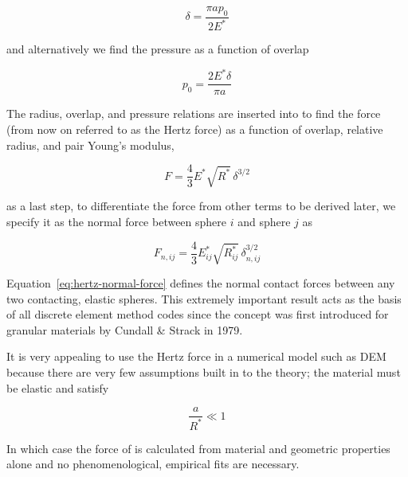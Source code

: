 \begin{equation}
	\delta = \frac{\pi a p_0}{2E^*}
\end{equation}

and alternatively we find the pressure as a function of overlap

\begin{equation}\label{eq:hertzian-pressure}
	p_0 = \frac{2E^*\delta}{\pi a}
\end{equation}

The radius, overlap, and pressure relations are inserted into  to find the force (from now on referred to as the Hertz force) as a function of overlap, relative radius, and pair Young's modulus,

\begin{equation}\label{eq:hertz-force}
	F = \frac{4}{3}E^* \sqrt{R^*} \, \delta^{3/2}
\end{equation}

as a last step, to differentiate the force from other terms to be derived later, we specify it as the normal force between sphere $i$ and sphere $j$ as

\begin{equation}\label{eq:hertz-normal-force}
	F_{n,ij} = \frac{4}{3}E_{ij}^* \sqrt{R_{ij}^*} \, \delta_{n,ij}^{3/2}
\end{equation}

Equation~\ref{eq:hertz-normal-force} defines the normal contact forces between any two contacting, elastic spheres. This extremely important result acts as the basis of all discrete element method codes since the concept was first introduced for granular materials by Cundall \& Strack in 1979\cite{Cundall1979}. 

It is very appealing to use the Hertz force in a numerical model such as DEM because there are very few assumptions built in to the theory; the material must be elastic and satisfy

\begin{equation}
	\frac{a}{R^*} \ll 1
\end{equation}

In which case the force of  is calculated from material and geometric properties alone and no phenomenological, empirical fits are necessary.



